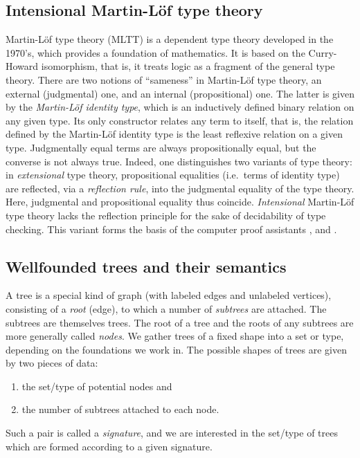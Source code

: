 \documentclass[a4paper,USenglish]{lipics}
\newcommand{\parencite}[1]{\cite{#1}}
\begin{document}
 \subsection{Intensional Martin-Löf type theory}\label{sec:mltt}
 Martin-Löf type theory (MLTT) \parencite{martin_lof} is a dependent type theory developed in the 1970's, which provides a foundation of mathematics.
 It is based on the Curry-Howard isomorphism, that is, it treats logic as a fragment of the general type theory.
 There are two notions of \enquote{sameness} in Martin-Löf type theory, an external (judgmental) one, and an internal (propositional) one.
 The latter is given by  the \emph{Martin-Löf identity type}, which is an inductively defined binary relation on any given type.
 Its only constructor relates any term to itself, that is, the relation defined by the Martin-Löf identity type is the least reflexive relation on a given type.
 Judgmentally equal terms are always propositionally equal, but the converse is not always true.
 Indeed, one distinguishes two variants of type theory: in \emph{extensional} type theory, propositional equalities (i.e.\ terms of identity type)
 are reflected, via a \emph{reflection rule}, into the judgmental equality of the type theory.  
 Here, judgmental and propositional equality thus coincide.
 \emph{Intensional} Martin-L\"of type theory  lacks the reflection principle for the sake of decidability of type checking. 
 This variant forms the basis of the computer proof assistants \coq, \matita and \agda.

 

 \subsection{Wellfounded trees and their semantics}\label{sec:sem_ind}
 
 A tree is a special kind of graph (with labeled edges and unlabeled vertices), consisting of a \emph{root} (edge), 
 to which a number of \emph{subtrees} are attached. 
 The subtrees are themselves trees.
 The root of a tree and the roots of any subtrees are more generally called \emph{nodes}.
 We gather trees of a fixed shape into a set or type, depending on the foundations we work in. 
 The possible shapes of trees are given by two pieces of data:
 \begin{enumerate}
  \item the set/type of potential nodes and
  \item the number of subtrees attached to each node.
 \end{enumerate}
 Such a pair is called a \emph{signature}, and we are interested in the set/type of trees which are formed according to a given signature.
 
\end{document}
